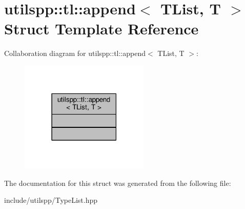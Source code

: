 \hypertarget{structutilspp_1_1tl_1_1append}{\section{utilspp\-:\-:tl\-:\-:append$<$ T\-List, T $>$ Struct Template Reference}
\label{structutilspp_1_1tl_1_1append}
}


Collaboration diagram for utilspp\-:\-:tl\-:\-:append$<$ T\-List, T $>$\-:\nopagebreak
\begin{figure}[H]
\begin{center}
\leavevmode
\includegraphics[width=174pt]{structutilspp_1_1tl_1_1append__coll__graph}
\end{center}
\end{figure}


The documentation for this struct was generated from the following file\-:\begin{DoxyCompactItemize}
\item 
include/utilspp/Type\-List.\-hpp\end{DoxyCompactItemize}
